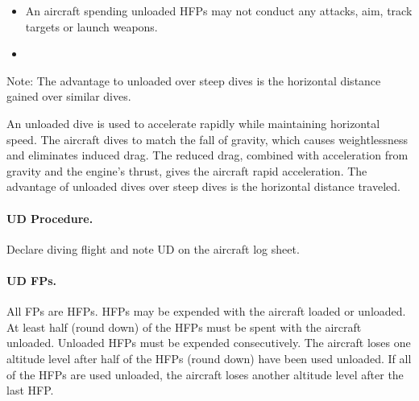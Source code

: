 {\begin{itemize}
    \item{} An aircraft spending unloaded HFPs may not conduct any attacks, aim, track targets or launch weapons. 

     \item{} 

\end{itemize}

Note: The advantage to unloaded over steep dives is the horizontal distance gained over similar dives.

}{

An unloaded dive is used to accelerate rapidly while maintaining horizontal speed. The aircraft dives to match the fall of gravity, which causes weightlessness and eliminates induced drag. The reduced drag, combined with acceleration from gravity and the engine's thrust, gives the aircraft rapid acceleration. The advantage of unloaded dives over steep dives is the horizontal distance traveled.

\paragraph{UD Procedure.} Declare diving flight and note UD on the aircraft log sheet. 

\paragraph{UD FPs.} All FPs are HFPs. HFPs may be expended with the aircraft loaded or unloaded. At least half (round down) of the HFPs must be spent with the aircraft unloaded. Unloaded HFPs must be expended consecutively. The aircraft loses one altitude level after half of the HFPs (round down) have been used unloaded. If all of the HFPs are used unloaded, the aircraft loses another altitude level after the last HFP.
   
}
